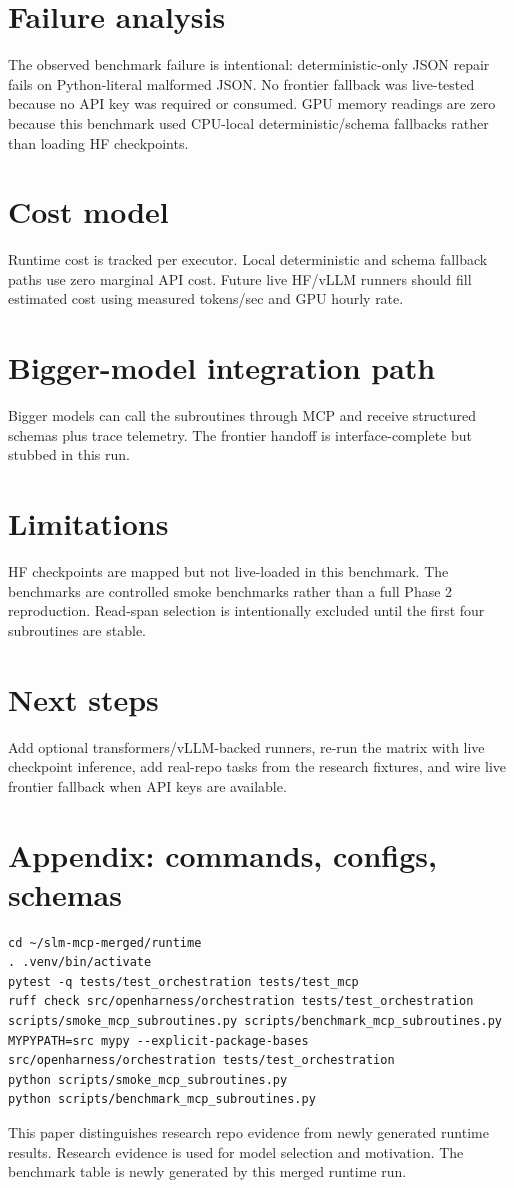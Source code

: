\documentclass[11pt]{article}
\begin{document}
\section{Failure analysis}
The observed benchmark failure is intentional: deterministic-only JSON repair fails on Python-literal malformed JSON. No frontier fallback was live-tested because no API key was required or consumed. GPU memory readings are zero because this benchmark used CPU-local deterministic/schema fallbacks rather than loading HF checkpoints.
\section{Cost model}
Runtime cost is tracked per executor. Local deterministic and schema fallback paths use zero marginal API cost. Future live HF/vLLM runners should fill estimated cost using measured tokens/sec and GPU hourly rate.
\section{Bigger-model integration path}
Bigger models can call the subroutines through MCP and receive structured schemas plus trace telemetry. The frontier handoff is interface-complete but stubbed in this run.
\section{Limitations}
HF checkpoints are mapped but not live-loaded in this benchmark. The benchmarks are controlled smoke benchmarks rather than a full Phase 2 reproduction. Read-span selection is intentionally excluded until the first four subroutines are stable.
\section{Next steps}
Add optional transformers/vLLM-backed runners, re-run the matrix with live checkpoint inference, add real-repo tasks from the research fixtures, and wire live frontier fallback when API keys are available.
\section{Appendix: commands, configs, schemas}
\begin{verbatim}
cd ~/slm-mcp-merged/runtime
. .venv/bin/activate
pytest -q tests/test_orchestration tests/test_mcp
ruff check src/openharness/orchestration tests/test_orchestration scripts/smoke_mcp_subroutines.py scripts/benchmark_mcp_subroutines.py
MYPYPATH=src mypy --explicit-package-bases src/openharness/orchestration tests/test_orchestration
python scripts/smoke_mcp_subroutines.py
python scripts/benchmark_mcp_subroutines.py
\end{verbatim}
This paper distinguishes research repo evidence from newly generated runtime results. Research evidence is used for model selection and motivation. The benchmark table is newly generated by this merged runtime run.
\end{document}
